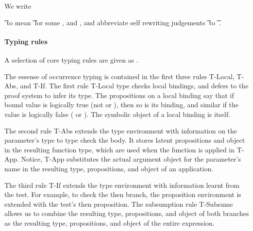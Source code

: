 We write 
{\judgementtworewrite{\propenv}{\e{}} {\t{}}{\ep{}} 
to mean 
{\judgementrewrite   {\propenv}
              {\e{}} {\t{}}
  {\filterset {\thenprop {\propp{}}}
              {\elseprop {\propp{}}}}
  {\objectp{}}
  {\ep{}}}
for some {\thenprop {\propp{}}}, {\elseprop {\propp{}}}
and {\objectp{}},
and
  abbreviate self rewriting judgements
{\judgementrewrite   {\propenv}
              {\e{}} {\t{}}
  {\filterset {\thenprop {\prop{}}}
              {\elseprop {\prop{}}}}
  {\object{}}
  {\e{}}}
to
{\judgementselfrewrite   {\propenv}
              {\e{}} {\t{}}
  {\filterset {\thenprop {\prop{}}}
              {\elseprop {\prop{}}}}
  {\object{}}}.


\paragraph{Typing rules}

A selection of core typing rules are
given as . 

The essense of occurrence typing is contained in the first three rules
T-Local, T-Abs, and T-If.
The first rule T-Local type checks local bindings, and defers to the proof system to infer its type.
The propositions on a local binding say that if bound value
is logically true (not \nil{} or \false{}), then so is its binding, and similar if the
value is logically false (\nil{} or \false{}).
The symbolic object of a local binding is itself.

The second rule T-Abs extends the type environment with information
on the parameter's type to type check the body. It stores latent
propositions and object in the resulting function type, which are
used when the function is applied in T-App.
Notice, T-App substitutes the actual argument object for the
parameter's name in the resulting type, propositions, and object
of an application.

The third rule T-If extends the type environment with information
learnt from the test. For example, to check the then branch, the proposition
environment is extended with the test's then proposition.
The subsumption rule T-Subsume allows us to combine the resulting type, propositions,
and object of both branches as the resulting type, propositions, and object
of the entire expression.

}
